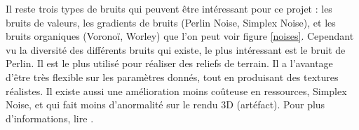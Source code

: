 \documentclass[a4paper]{article}
\begin{document}
        
    Il reste trois types de bruits qui peuvent être intéressant pour ce projet : les bruits de valeurs, les gradients de bruits (Perlin Noise, Simplex Noise), et les bruits organiques (Voronoï, Worley) que l'on peut voir figure  \ref{noises}. Cependant vu la diversité des différents bruits qui existe, le plus intéressant est le bruit de Perlin. Il est le plus utilisé pour réaliser des reliefs de terrain. Il a l'avantage d'être très flexible sur les paramètres donnés, tout en produisant des textures réalistes. Il existe aussi une amélioration moins coûteuse en ressources, Simplex Noise, et qui fait moins d'anormalité sur le rendu 3D (artéfact). Pour plus d'informations, lire \cite{BookShader}.
\newpage
\end{document}
